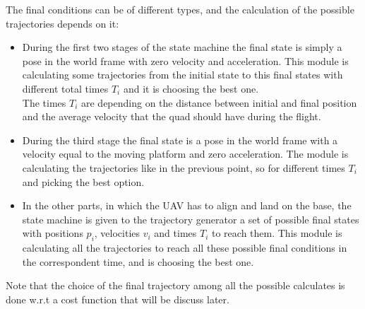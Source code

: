 The final conditions can be of different types, and the calculation of the possible trajectories depends on it:
\begin{itemize}
\item During the first two stages of the state machine the final state is simply a pose in the world frame with zero velocity and acceleration. This module is calculating some trajectories from the initial state to this final states with different total times $T_i$ and it is choosing the best one.\\ 
The times $T_i$ are depending on the distance between initial and final position and the average velocity that the quad should have during the flight.
\item During the third stage the final state is a pose in the world frame with a velocity equal to the moving platform and zero acceleration. The module is calculating the trajectories like in the previous point, so for different times $T_i$ and picking the best option.
\item In the other parts, in which the UAV has to align and land on the base, the state machine is given to the trajectory generator a set of possible final states with positions $p_i$, velocities $v_i$ and times $T_i$ to reach them. This module is calculating all the trajectories to reach all these possible final conditions in the correspondent time, and is choosing the best one.
\end{itemize}
Note that the choice of the final trajectory among all the possible calculates is done w.r.t a cost function that will be discuss later.

